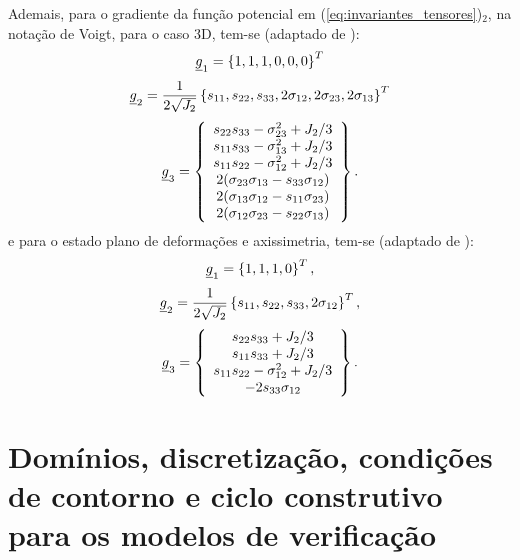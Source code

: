 Ademais, para o gradiente da função potencial em (\ref{eq:invariantes_tensores})$_2$, na notação de Voigt, para o caso 3D, tem-se (adaptado de ):
\begin{equation}
	\label{eq:g1_3D}
	\underline{g}_1 = \left\{1,1,1,0,0,0\right\}^T
\end{equation}
\begin{equation}
	\label{eq:g2_3D}
	\underline{g}_2 = \dfrac{1}{2\sqrt{J_2}} \left\{s_{11},s_{22},s_{33},2\sigma_{12},2\sigma_{23},2\sigma_{13}\right\}^T
\end{equation}
\begin{equation}
	\label{eq:g3_3D}
	\underline{g}_3 = \left\{
	\begin{array}{ccc}
	s_{22}s_{33}-\sigma_{23}^2 + J_2/3 \\
	s_{11}s_{33}-\sigma_{13}^2 + J_2/3 \\	
	s_{11}s_{22}-\sigma_{12}^2 + J_2/3 \\
	2(\sigma_{23}\sigma_{13}-s_{33}\sigma_{12}) \\
	2(\sigma_{13}\sigma_{12}-s_{11}\sigma_{23}) \\
	2(\sigma_{12}\sigma_{23}-s_{22}\sigma_{13})
	\end{array} \right\}.
\end{equation}
e para o estado plano de deformações e axissimetria, tem-se (adaptado de ):
\begin{equation}
	\label{eq:g1_2D}
	\underline{g}_1 = \left\{1,1,1,0\right\}^T,
\end{equation}
\begin{equation}
	\label{eq:g2_2D}
	\underline{g}_2 = \dfrac{1}{2\sqrt{J_2}} \left\{s_{11},s_{22},s_{33},2\sigma_{12}\right\}^T,
\end{equation}
\begin{equation}
	\label{eq:g3_2D}
	\underline{g}_3 = \left\{
	\begin{array}{ccc}
		s_{22}s_{33} + J_2/3 \\
		s_{11}s_{33} + J_2/3 \\	
		s_{11}s_{22}-\sigma_{12}^2 + J_2/3 \\
		- 2s_{33}\sigma_{12}
	\end{array} \right\}.
\end{equation}

\section{Domínios, discretização, condições de contorno e ciclo construtivo para os modelos de verificação}

